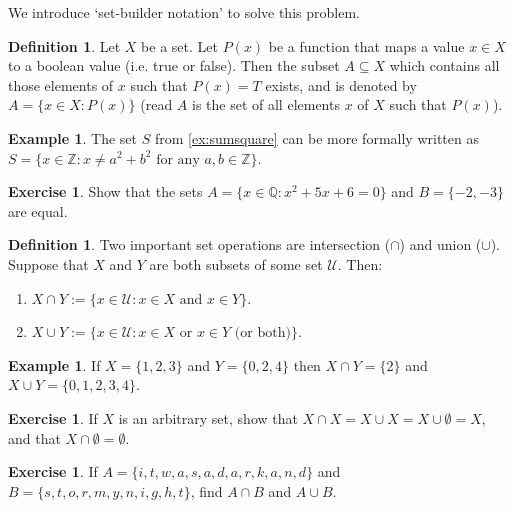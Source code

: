 \documentclass[a4paper, 10pt]{amsart}
\theoremstyle{definition}
\newtheorem{defn}[thm]{Definition}
\newtheorem{ex}[thm]{Example}
\newtheorem{exercise}[thm]{Exercise}
\theoremstyle{remark}
\begin{document}
We introduce `set-builder notation' to solve this problem.
\begin{defn}
  Let $ X $ be a set.  Let $ P(x) $ be a function that maps a value $ x \in X $ to a boolean value (i.e. true or false). Then
  the subset $ A \subseteq X $ which contains all those elements of $ x $ such that $ P(x) = T $ exists, and is denoted by
  $ A = \{ x \in X : P(x) \} $ (read $ A $ is the set of all elements $ x $ of $ X $ such that $ P(x) $).
\end{defn}

\begin{ex}
  The set $ S $ from \cref{ex:sumsquare} can be more formally written as $ S = \{ x \in \mathbb{Z}: x \neq a^2 + b^2 \text{ for any } a, b \in \mathbb{Z}\} $.
\end{ex}

\begin{exercise}
  Show that the sets $ A = \{x \in \mathbb{Q} : x^2 + 5x + 6 = 0 \} $ and $ B = \{-2, -3\} $ are equal.
\end{exercise}

\begin{defn}
  Two important set operations are intersection ($ \cap $) and union ($ \cup $). Suppose that $ X $ and $ Y $ are both
  subsets of some set $ \mathcal{U} $. Then:
  \begin{enumerate}
    \item $ X \cap Y := \{x \in \mathcal{U} : x \in X \text{ and } x \in Y \}. $
    \item $ X \cup Y := \{x \in \mathcal{U} : x \in X \text{ or } x \in Y \text{ (or both)}\}. $
  \end{enumerate}
\end{defn}

\begin{ex}
  If $ X = \{1, 2, 3\} $ and $ Y = \{0, 2, 4\} $ then $ X \cap Y = \{2\} $ and $ X \cup Y = \{0, 1, 2, 3, 4\} $.
\end{ex}

\begin{exercise}
  If $ X $ is an arbitrary set, show that $ X \cap X = X \cup X = X \cup \emptyset = X $, and that $ X \cap \emptyset = \emptyset $.
\end{exercise}

\begin{exercise}
  If $ A = \{i,\allowbreak t,\allowbreak w,\allowbreak a,\allowbreak s,\allowbreak a,\allowbreak d,\allowbreak a,\allowbreak r,\allowbreak k,
  \allowbreak a,\allowbreak n,\allowbreak d\} $ and $ B = \{s,\allowbreak t,\allowbreak o,\allowbreak r,\allowbreak m,\allowbreak y,\allowbreak n,
  \allowbreak i,\allowbreak g,\allowbreak h,\allowbreak t\} $, find $ A \cap B $ and $ A \cup B $.
\end{exercise}
\end{document}
